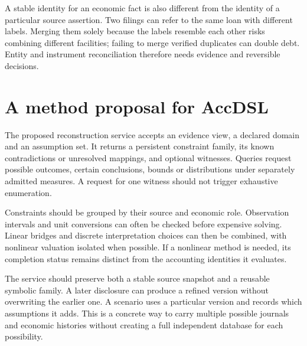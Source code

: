 A stable identity for an economic fact is also different from the identity of a particular source assertion. Two filings can refer to the same loan with different labels. Merging them solely because the labels resemble each other risks combining different facilities; failing to merge verified duplicates can double debt. Entity and instrument reconciliation therefore needs evidence and reversible decisions.

\section{A method proposal for AccDSL}
The proposed reconstruction service accepts an evidence view, a declared domain and an assumption set. It returns a persistent constraint family, its known contradictions or unresolved mappings, and optional witnesses. Queries request possible outcomes, certain conclusions, bounds or distributions under separately admitted measures. A request for one witness should not trigger exhaustive enumeration.

Constraints should be grouped by their source and economic role. Observation intervals and unit conversions can often be checked before expensive solving. Linear bridges and discrete interpretation choices can then be combined, with nonlinear valuation isolated when possible. If a nonlinear method is needed, its completion status remains distinct from the accounting identities it evaluates.

The service should preserve both a stable source snapshot and a reusable symbolic family. A later disclosure can produce a refined version without overwriting the earlier one. A scenario uses a particular version and records which assumptions it adds. This is a concrete way to carry multiple possible journals and economic histories without creating a full independent database for each possibility.
